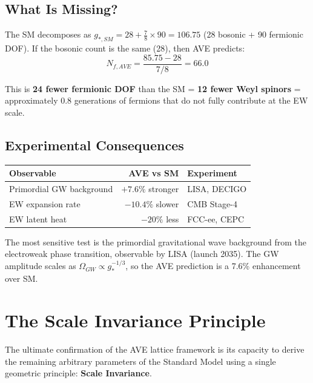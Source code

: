 \subsection{What Is Missing?}

The SM decomposes as $g_{*,SM} = 28 + \frac{7}{8} \times 90 = 106.75$
(28 bosonic + 90 fermionic DOF).  If the bosonic count is the same
(28), then AVE predicts:
\begin{equation}
    N_{f,AVE} = \frac{85.75 - 28}{7/8} = 66.0
\end{equation}

This is \textbf{24 fewer fermionic DOF} than the SM = \textbf{12 fewer
Weyl spinors} = approximately 0.8 generations of fermions that do not
fully contribute at the EW scale.

\subsection{Experimental Consequences}

\begin{center}
\small
\begin{tabular}{lrl}
\toprule
\textbf{Observable} & \textbf{AVE vs SM} & \textbf{Experiment} \\
\midrule
Primordial GW background & $+7.6\%$ stronger & LISA, DECIGO \\
EW expansion rate & $-10.4\%$ slower & CMB Stage-4 \\
EW latent heat & $-20\%$ less & FCC-ee, CEPC \\
\bottomrule
\end{tabular}
\end{center}

The most sensitive test is the primordial gravitational wave
background from the electroweak phase transition, observable by
LISA (launch 2035).  The GW amplitude scales as $\Omega_{GW}
\propto g_*^{-1/3}$, so the AVE prediction is a 7.6\% enhancement
over SM.

\section{The Scale Invariance Principle}
\label{sec:scale_invariance}

The ultimate confirmation of the AVE lattice framework is its capacity
to derive the remaining arbitrary parameters of the Standard Model using
a single geometric principle: \textbf{Scale Invariance}.

